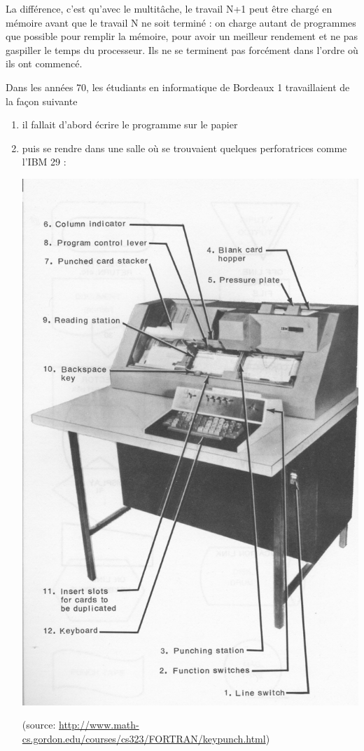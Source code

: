 \begin{multicols}{2}
La différence, c'est qu'avec le multitâche, le travail N+1 peut être
chargé en mémoire avant que le travail N ne soit terminé : on charge
autant de programmes que possible pour remplir la mémoire, pour avoir
un meilleur rendement et ne pas gaspiller le temps du processeur.
Ils ne se terminent pas forcément dans l'ordre où ils ont commencé.


Dans les années 70, les étudiants en informatique de Bordeaux 1 travaillaient de la façon suivante
\begin{enumerate}
\item il fallait d'abord écrire le programme sur le papier
\item puis se rendre dans une salle où se trouvaient quelques perforatrices comme l'IBM 29 :

\begin{center}
\includegraphics[width=0.8\linewidth]{memoire-images/keypunch.jpg}
\end{center}
(source: \url{http://www.math-cs.gordon.edu/courses/cs323/FORTRAN/keypunch.html})


\end{enumerate}
\end{multicols}
